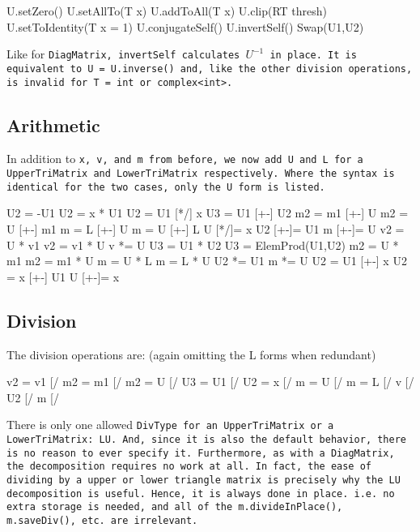\begin{tmvcode}
U.setZero()
U.setAllTo(T x)
U.addToAll(T x)
U.clip(RT thresh)
U.setToIdentity(T x = 1)
U.conjugateSelf()
U.invertSelf()
Swap(U1,U2)
\end{tmvcode}
Like for \tt{DiagMatrix}, \tt{invertSelf} calculates $U^{-1}$ in place.  
It is equivalent to \tt{U = U.inverse()} and, like the other division operations, is invalid for \tt{T = int} or \tt{complex<int>}.
\vspace{12pt}

\subsection{Arithmetic}
\label{TriMatrix_Arithmetic}

In addition to \tt{x}, \tt{v}, and \tt{m} from before, 
we now add \tt{U} and \tt{L} for a \tt{UpperTriMatrix}
and \tt{LowerTriMatrix} respectively.  Where the syntax is identical
for the two cases, only the \tt{U} form is listed.

\begin{tmvcode}
U2 = -U1
U2 = x * U1
U2 = U1 [*/] x
U3 = U1 [+-] U2
m2 = m1 [+-] U
m2 = U [+-] m1
m = L [+-] U
m = U [+-] L
U [*/]= x
U2 [+-]= U1
m [+-]= U
v2 = U * v1
v2 = v1 * U
v *= U
U3 = U1 * U2
U3 = ElemProd(U1,U2)
m2 = U * m1
m2 = m1 * U
m = U * L
m = L * U
U2 *= U1
m *= U
U2 = U1 [+-] x
U2 = x [+-] U1
U [+-]= x
\end{tmvcode}

\subsection{Division}
\label{TriMatrix_Division}

The division operations are: (again omitting the L forms when redundant)
\begin{tmvcode}
v2 = v1 [/%
m2 = m1 [/%
m2 = U [/%
U3 = U1 [/%
U2 = x [/%
m = U [/%
m = L [/%
v [/%
U2 [/%
m [/%
\end{tmvcode}

There is only one allowed \tt{DivType} for an \tt{UpperTriMatrix} or a 
\tt{LowerTriMatrix}: \tt{LU}.
And, since it is also the default behavior,
there is no reason to ever specify it.
Furthermore, as with a \tt{DiagMatrix},
the decomposition requires no work at all.  In fact, the ease of dividing by a 
upper or lower triangle matrix is precisely why the LU decomposition is useful.
Hence, it is always done in place.  i.e. no extra storage is needed, and all of
the \tt{m.divideInPlace()}, \tt{m.saveDiv()}, etc. are irrelevant.

